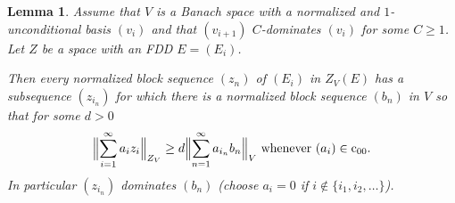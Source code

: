 \documentclass[11pt,leqno]{amsart}
\newtheorem{lem}[thm]{Lemma}
\theoremstyle{definition}
\newcommand{\coo}{\mathrm{c}_{00}}
\begin{document}
\begin{lem}\label{L:2.1} Assume that $V$ is a Banach space with   a normalized
 and $1$-unconditional basis $(v_{i})$ and  that
 $(v_{i+1})$  $C$-dominates $(v_i)$ for some $C\ge1$. Let $Z$ be a space with an FDD $E=(E_i)$.

Then every normalized block sequence $(z_n)$ of $(E_i)$ in
 $Z_V(E)$ has a subsequence $(z_{i_n})$  for which there is a normalized
 block sequence $(b_n)$ in $V$ so that for some $d>0$
\begin{equation}\label{E:2.2.1}
\Bigl\|\sum_{i=1}^\infty a_iz_i\Bigr\|_{Z_V}\ge d
\Bigl\|\sum_{n=1}^\infty a_{i_n} b_{n}\Bigr\|_V\text{ whenever }(a_i)\in \coo.
 \end{equation}
In particular $(z_{i_n})$ dominates $(b_n)$ (choose $a_i=0$ if $i\not\in\{i_1,i_2,\ldots\}$).
\end{lem}
\end{document}
